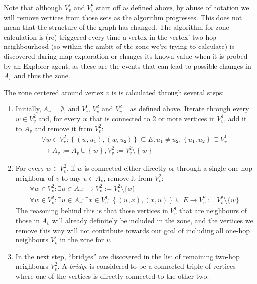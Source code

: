 Note that although $V_v^1$ and $V_v^2$ start off as defined above, by abuse of notation we will remove vertices from those sets as the algorithm progresses.
This does not mean that the structure of the graph has changed.
The algorithm for zone calculation is (re)-triggered every time a vertex in the vertex' two-hop neighbourhood (so within the ambit of the zone we're trying to calculate) is discovered during map exploration or changes its known value when it is probed by an Explorer agent, as these are the events that can lead to possible changes in $A_v$ and thus the zone.

The zone centered around vertex $v$ is is calculated through several steps:
\begin{enumerate}
  \item Initially, $A_v = \emptyset$, and $V_v^1$, $V_v^2$ and $V_v^{2+}$ as defined above.
        Iterate through every $w \in V_v^2$ and, for every $w$ that is connected to 2 or more vertices in $V_v^1$, add it to $A_v$ and remove it from $V_v^2$:
        \begin{multline}
        \forall w \in V_v^2: \left\{\left(w, u_1 \right ), \left(w, u_2 \right )\right\} \subseteq E, u_1 \neq u_2, \left\{u_1, u_2\right\} \subseteq V_v^1 \\
        \rightarrow A_v := A_v \cup \left\{w\right\}, V_v^2 := V_v^2 \setminus \left\{w \right \}
        \end{multline}
  \item For every $w \in V_v^2$, if $w$ is connected either directly or through a single one-hop neighbour of $v$ to any $u \in A_v$, remove it from $V_v^2$:
  \begin{multline}
  \forall w \in V_v^2: \exists u \in A_v: \rightarrow V_v^2 := V_v^2 \setminus \{w\}
\\ \forall w \in V_v^2: \exists u \in A_v: \exists x \in V_v^1: \left\{\left(w, x \right ), \left(x, u \right )\right\} \subseteq E\rightarrow V_v^2 := V_v^2 \setminus \{w\}
  \end{multline}
      The reasoning behind this is that those vertices in $V_v^1$ that are neighbours of those in $A_v$ will already definitely be included in the zone, and the vertices we remove this way will not contribute towards our goal of including all one-hop neighbours $V_v^1$ in the zone for $v$.
  \item In the next step, \enquote{bridges} are discovered in the list of remaining two-hop neighbours $V_v^2$.
        A \emph{bridge} is considered to be a connected triple of vertices where one of the vertices is directly connected to the other two.

\end{enumerate}
